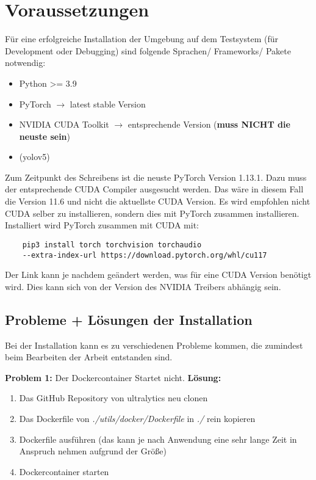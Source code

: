 \chapter{Voraussetzungen}

Für eine erfolgreiche Installation der Umgebung auf dem Testsystem (für Development oder Debugging) sind folgende Sprachen/ Frameworks/ Pakete notwendig:
\begin{itemize}
    \item Python >= 3.9
    \item PyTorch $\rightarrow$ latest stable Version
    \item NVIDIA CUDA Toolkit $\rightarrow$ entsprechende Version (\textbf{muss NICHT die neuste sein})
    \item (yolov5)
\end{itemize}

Zum Zeitpunkt des Schreibens ist die neuste PyTorch Version 1.13.1. Dazu muss der entsprechende CUDA Compiler ausgesucht werden. Das wäre in diesem Fall die Version 11.6 und nicht die aktuellste CUDA Version. Es wird empfohlen nicht CUDA selber zu installieren, sondern dies mit PyTorch zusammen installieren. Installiert wird PyTorch zusammen mit CUDA mit:
\begin{verbatim}
    pip3 install torch torchvision torchaudio 
    --extra-index-url https://download.pytorch.org/whl/cu117
\end{verbatim}
Der Link kann je nachdem geändert werden, was für eine CUDA Version benötigt wird. Dies kann sich von der Version des NVIDIA Treibers abhängig sein.
\section{Probleme + Lösungen der Installation}

Bei der Installation kann es zu verschiedenen Probleme kommen, die zumindest beim Bearbeiten der Arbeit entstanden sind.

\textbf{Problem 1:} Der Dockercontainer Startet nicht.
\label{text:docker}
\textbf{Lösung:} 
\begin{enumerate}
    \item Das GitHub Repository von ultralytics \cite{glennjocher.2023} neu clonen 
    \item Das Dockerfile von \textit{./utils/docker/Dockerfile} in \textit{./} rein kopieren
    \item Dockerfile ausführen  (das kann je nach Anwendung eine sehr lange Zeit in Anspruch nehmen aufgrund der Größe)
    \item Dockercontainer starten
\end{enumerate}

